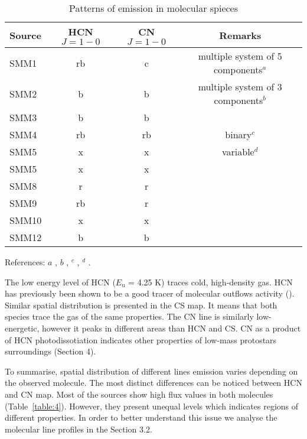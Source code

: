 \documentclass{aa}
\begin{document}
\begin{table*}
\caption{Patterns of emission in molecular spieces}             %
\label{table:outflows}      %
\centering                          %
\begin{tabular}{l c c c} 
\hline\hline 
Source & HCN $J=1-0$ & CN $J=1-0$ & Remarks \\
\hline  
SMM1 & rb & c & multiple system of 5 components$^a$\\
SMM2 & b & b & multiple system of 3 components$^b$ \\ 
SMM3 & b & b & \\  
SMM4 & rb & rb & binary$^c$ \\ 
SMM5 & x & x & variable$^d$ \\ 
SMM5 & x & x & \\
SMM8 & r & r & \\
SMM9 & rb & r & \\ 
SMM10 & x & x & \\  
SMM12 & b & b & \\
\hline
\end{tabular}
\begin{flushleft}
References: $a$ \cite{Hul17}, $b$ \cite{Fra19}, $^c$ \cite{Aso18}, $^d$ \cite{Yoo17}.\\
\end{flushleft}
\end{table*}

The low energy level of HCN ($E_\mathrm{u}$ = 4.25 K) traces cold, high-density gas. HCN has previously been shown to be a good tracer of molecular outflows activity (\cite{Wal14}). Similar spatial distribution is presented in the CS map. It means that both species trace the gas of the same properties. The CN line is similarly low-energetic, however it peaks in different areas than HCN and CS. CN as a product of HCN photodissotiation indicates other properties of low-mass protostars surroundings (Section 4).

To summarise, spatial distribution of different lines emission varies depending on the observed molecule. The most distinct differences can be noticed between HCN and CN map. Most of the sources show high flux values in both molecules (Table~\ref{table:4}). However, they present unequal levels which indicates regions of different properties. In order to better understand this issue we analyse the molecular line profiles in the Section 3.2. 
\end{document}
